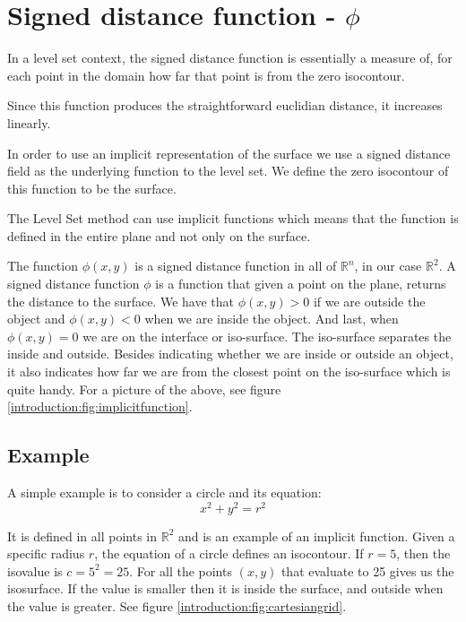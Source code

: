 \section*{Signed distance function - $\phi$}

In a level set context, the signed distance function is essentially a
measure of, for each point in the domain how far that point is from
the zero isocontour.

Since this function produces the straightforward euclidian distance,
it increases linearly. 

In order to use an implicit representation of the surface we use a
signed distance field as the underlying function to the level set. We
define the zero isocontour of this function to be the surface.

The Level Set method can use implicit functions which means that the
function is defined in the entire plane and not only on the surface.

The function $\phi(x,y)$ is a signed distance function in all of
$\mathbb{R}^{n}$, in our case $\mathbb{R}^{2}$. A signed distance
function $\phi$ is a function that given a point on the plane, returns
the distance to the surface. We have that $\phi(x,y) > 0$ if we are
outside the object and $\phi(x,y) < 0$ when we are inside the object.
And last, when $\phi(x,y) = 0$ we are on the interface or iso-surface.
The iso-surface separates the inside and outside.  Besides indicating
whether we are inside or outside an object, it also indicates how far
we are from the closest point on the iso-surface which is quite
handy. For a picture of the above, see figure
\vref{introduction:fig:implicitfunction}.



\subsection*{Example}

A simple example is to consider a circle and its equation:
\begin{equation*} 
  x^{2} + y^{2} = r^{2}
\end{equation*}

It is defined in all points in $\mathbb{R}^{2}$ and is an example of
an implicit function. Given a specific radius $r$, the equation of a
circle defines an isocontour. If $r = 5$, then the isovalue is $c =
5^{2} = 25$. For all the points $(x,y)$ that evaluate to 25 gives us
the isosurface. If the value is smaller then it is inside the surface,
and outside when the value is greater. See figure
\vref{introduction:fig:cartesiangrid}.


